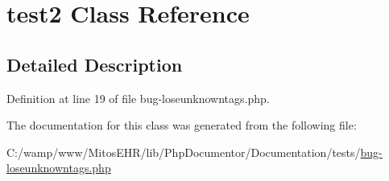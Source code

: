 \hypertarget{classtest2}{\section{test2 \-Class \-Reference}
\label{classtest2}
}


\subsection{\-Detailed \-Description}


\-Definition at line 19 of file bug-\/loseunknowntags.\-php.



\-The documentation for this class was generated from the following file\-:\begin{DoxyCompactItemize}
\item 
\-C\-:/wamp/www/\-Mitos\-E\-H\-R/lib/\-Php\-Documentor/\-Documentation/tests/\hyperlink{bug-loseunknowntags_8php}{bug-\/loseunknowntags.\-php}\end{DoxyCompactItemize}
